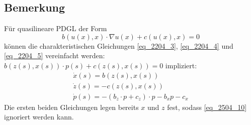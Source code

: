 \subsection{Bemerkung}
\label{bem_10}
	Für quasilineare PDGL der Form \marginnote{[10]}
	\[ b(u(x),x) \cdot \nabla u(x) + c(u(x),x) = 0 \]
	können die charakteristischen Gleichungen \eqref{eq_2204_3}, \eqref{eq_2204_4} und \eqref{eq_2204_5} vereinfacht werden: $b(z(s),x(s)) \cdot p(s) + c(z(s),x(s)) = 0$ impliziert:
	\begin{align}
		\dot{x}(s) = b(z(s),x(s))	\label{eq_2504_8} \\
		\dot{z}(s) = -c(z(s),x(s))	\label{eq_2504_9} \\
		\dot{p}(s) = -(b_z \cdot p + c_z)\cdot p - b_x p -c_x	\label{eq_2504_10}
	\end{align}
	Die ersten beiden Gleichungen legen bereits $x$ und $z$ fest, sodass \eqref{eq_2504_10} ignoriert werden kann.
\newpage